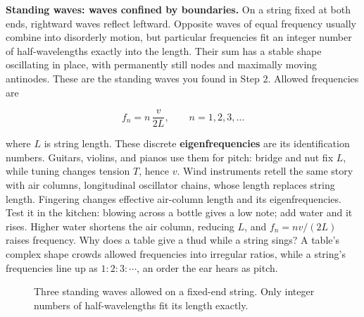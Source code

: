 \begin{mainline}
\textbf{Standing waves: waves confined by boundaries.} On a string fixed at both ends, rightward waves reflect leftward. Opposite waves of equal frequency usually combine into disorderly motion, but particular frequencies fit an integer number of half-wavelengths exactly into the length. Their sum has a stable shape oscillating in place, with permanently still nodes and maximally moving antinodes. These are the standing waves you found in Step 2. Allowed frequencies are

\[
  f_n = n\,\frac{v}{2L}, \qquad n=1,2,3,\dots
\]

where \(L\) is string length. These discrete \textbf{eigenfrequencies} are its identification numbers. Guitars, violins, and pianos use them for pitch: bridge and nut fix \(L\), while tuning changes tension \(T\), hence \(v\). Wind instruments retell the same story with air columns, longitudinal oscillator chains, whose length replaces string length. Fingering changes effective air-column length and its eigenfrequencies. Test it in the kitchen: blowing across a bottle gives a low note; add water and it rises. Higher water shortens the air column, reducing \(L\), and \(f_n = nv/(2L)\) raises frequency. Why does a table give a thud while a string sings? A table's complex shape crowds allowed frequencies into irregular ratios, while a string's frequencies line up as \(1:2:3:\cdots\), an order the ear hears as pitch.
\end{mainline}

\begin{figure}[htbp]
\centering
{}
\caption{Three standing waves allowed on a fixed-end string. Only integer numbers of half-wavelengths fit its length exactly.}
\end{figure}

